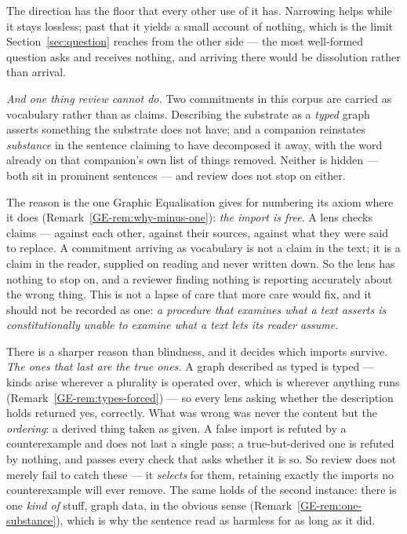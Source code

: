\documentclass[11pt,a4paper]{article}
\begin{document}
The direction has the floor that every other use of it has. Narrowing helps while it stays lossless;
past that it yields a small account of nothing, which is the limit Section~\ref{sec:question} reaches from the
other side --- the most well-formed question asks and receives nothing, and arriving there would be
dissolution rather than arrival.

\emph{And one thing review cannot do.} Two commitments in this corpus are carried as vocabulary
rather than as claims. Describing the substrate as a \emph{typed} graph asserts something the
substrate does not have; and a companion reinstates \emph{substance} in the sentence claiming to have
decomposed it away, with the word already on that companion's own list of things removed. Neither is
hidden --- both sit in prominent sentences --- and review does not stop on either.

The reason is the one Graphic Equalisation gives for numbering its axiom where it does
(Remark~\ref{GE-rem:why-minus-one}): \emph{the import
is free}. A lens checks claims --- against each other, against their sources, against what they were
said to replace. A commitment arriving as vocabulary is not a claim in the text; it is a claim in the
reader, supplied on reading and never written down. So the lens has nothing to stop on, and a reviewer
finding nothing is reporting accurately about the wrong thing. This is not a lapse of care that more
care would fix, and it should not be recorded as one: \emph{a procedure that examines what a text
asserts is constitutionally unable to examine what a text lets its reader assume}.

There is a sharper reason than blindness, and it decides which imports survive. \emph{The ones that
last are the true ones.} A graph described as typed is typed --- kinds arise wherever a plurality is
operated over, which is wherever anything runs (Remark~\ref{GE-rem:types-forced}) --- so every lens
asking whether the description holds
returned yes, correctly. What was wrong was never the content but the \emph{ordering}: a derived thing
taken as given. A false import is refuted by a counterexample and does not last a single pass; a
true-but-derived one is refuted by nothing, and passes every check that asks whether it is so. So
review does not merely fail to catch these --- it \emph{selects} for them, retaining exactly the
imports no counterexample will ever remove. The same holds of the second instance: there is one
\emph{kind of} stuff, graph data, in the obvious sense (Remark~\ref{GE-rem:one-substance}), which is
why the sentence read as harmless for as long as it did.
\end{document}
